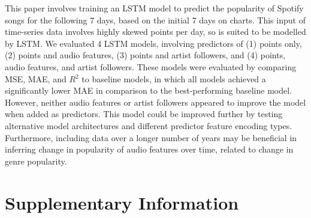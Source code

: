 \documentclass{article}
\begin{document}
This paper involves training an LSTM model to predict the popularity of Spotify songs for the following 7 days, based on the initial 7 days on charts. This input of time-series data involves highly skewed  points per day, so is suited to be modelled by LSTM. We evaluated 4 LSTM models, involving predictors of (1) points only, (2) points and audio features, (3) points and artist followers, and (4) points, audio features, and artist followers. These models were evaluated by comparing MSE, MAE, and $R{^2}$ to baseline models, in which all models achieved a significantly lower MAE in comparison to the best-performing baseline model. However, neither audio features or artist followers appeared to improve the model when added as predictors. This model could be improved further by testing alternative model architectures and different predictor feature encoding types. 
 Furthermore, including data over a longer number of years may be beneficial in inferring change in popularity of audio features over time, related to change in genre popularity.
\newpage


\newpage
\section*{Supplementary Information}
\end{document}
